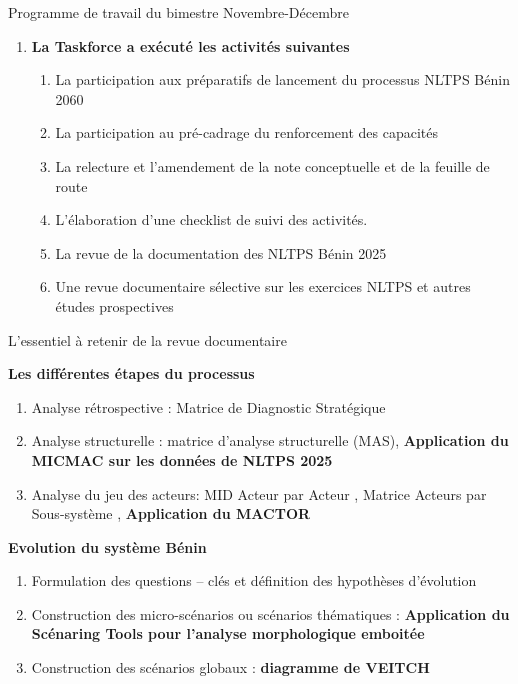 \documentclass[11pt]{beamer}
\begin{document}
\begin{frame}{Programme de travail du bimestre Novembre-Décembre}
\begin{enumerate} [<+->]
\item \textbf{La Taskforce a exécuté les activités suivantes}
\begin{enumerate} [<+->]
\item La participation aux préparatifs de lancement du processus NLTPS Bénin 2060 \vfill
\item La participation au pré-cadrage du renforcement des capacités \vfill
\item La relecture et l’amendement de la note conceptuelle et de la feuille de route \vfill
\item L’élaboration d’une checklist de suivi des activités. \vfill
\item La revue de la documentation des NLTPS Bénin 2025 \vfill
\item Une revue documentaire sélective sur les exercices NLTPS et autres études prospectives \vfill
\end{enumerate}
\end{enumerate}
\end{frame}


\begin{frame}{L'essentiel à retenir de la revue documentaire}

\begin{exampleblock}{  \textbf{ Les différentes étapes du processus} }
     \begin{enumerate} [<+->]
      \item   Analyse rétrospective  : Matrice de Diagnostic Stratégique  \vfill
      \item    Analyse structurelle : matrice d'analyse structurelle (MAS), \textbf{Application du MICMAC sur les données de NLTPS 2025} \vfill
      \item    Analyse du jeu des acteurs: MID Acteur par Acteur , Matrice Acteurs par Sous-système , \textbf{Application du MACTOR}  \vfill
     \end{enumerate}
\end{exampleblock}

\begin{block}{ \textbf{Evolution du système Bénin} }
  \begin{enumerate} [<+->]
  \item   Formulation des questions – clés et  définition des hypothèses d’évolution   \vfill
  \item   Construction des micro-scénarios ou scénarios thématiques : \textbf{Application du Scénaring Tools pour l'analyse morphologique emboitée}  \vfill
  \item   Construction des scénarios globaux : \textbf{diagramme de VEITCH} 
  \end{enumerate}
\end{block}
\end{frame}
\end{document}
